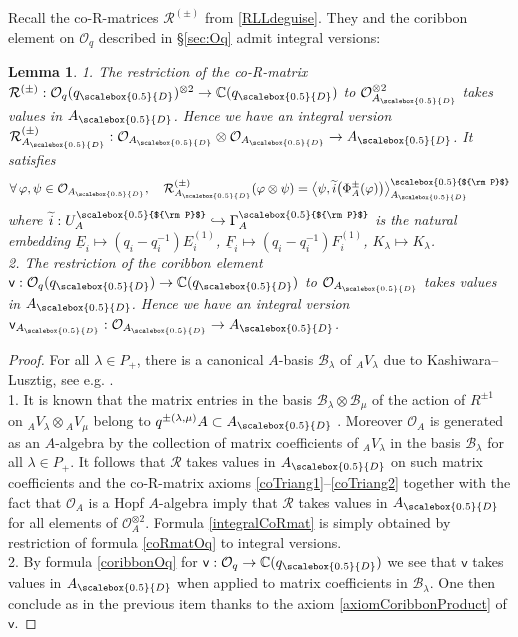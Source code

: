 \documentclass[11pt]{amsart}
\newtheorem{lem}[teo]{Lemma}
\newcommand{\Oo}{\mathcal{O}}
\newcommand{\qD}{q_{\scalebox{0.5}{D}}}
\newcommand{\AD}{A_{\scalebox{0.5}{D}}}
\newcommand{\Pup}{{\scalebox{0.5}{${\rm P}$}}}
\begin{document}
\indent Recall the co-R-matrices $\mathcal{R}^{(\pm)}$ from \eqref{RLLdeguise}. They and the coribbon element on $\mathcal{O}_q$ described in \S\ref{sec:Oq} admit integral versions:
\begin{lem}\label{lemIntegralRandCorib}
1. The restriction of the co-R-matrix $\mathcal{R}^{(\pm)} : \mathcal{O}_q(\qD)^{\otimes 2} \to \mathbb{C}(\qD)$ to $\mathcal{O}_{\AD}^{\otimes 2}$ takes values in $\AD$. Hence we have an integral version $\mathcal{R}_{\AD}^{(\pm)}  : \mathcal{O}_{\AD} \otimes \mathcal{O}_{\AD} \to \AD$. It satisfies
\begin{equation}\label{integralCoRmat}
\forall \, \varphi, \psi \in \Oo_{\AD}, \quad \mathcal{R}_{\AD}^{(\pm)} (\varphi \otimes \psi) = \bigl\langle  \psi, \widetilde{i}\bigl(\Phi^\pm_A(\varphi) \bigr) \bigr\rangle_{\AD}^\Pup
\end{equation}
where $\widetilde{i} :  U_A^\Pup \hookrightarrow \Gamma_A^\Pup$ is the natural embedding $\underline{E}_i \mapsto (q_i-q_i^{-1})E_i^{(1)}$, $\underline{F}_i \mapsto (q_i-q_i^{-1})F_i^{(1)}$, $K_\lambda \mapsto K_\lambda$.
\\2. The restriction of the coribbon element $\mathsf{v} : \mathcal{O}_q(\qD) \to \mathbb{C}(\qD)$ to $\mathcal{O}_{\AD}$ takes values in $\AD$. Hence we have an integral version $\mathsf{v}_{\AD} : \mathcal{O}_{\AD} \to \AD$.
\end{lem}
\begin{proof}
For all $\lambda \in P_+$, there is a canonical $A$-basis $\mathcal{B}_\lambda$ of $_AV_\lambda$ due to Kashiwara--Lusztig, see e.g. \cite[Chap.\,14]{CP}.
\\1. It is known that the matrix entries in the basis $\mathcal{B}_\lambda \otimes \mathcal{B}_\mu$ of the action of $R^{\pm 1}$ on ${}_AV_\lambda \otimes {}_AV_\mu$ belong to $q^{\pm (\lambda,\mu)}A \subset \AD$ \cite[Th.\,32.1.5]{Lusztig}. Moreover $\mathcal{O}_A$ is generated as an $A$-algebra by the collection of matrix coefficients of $_AV_\lambda$ in the basis $\mathcal{B}_\lambda$ for all $\lambda \in P_+$. It follows that $\mathcal{R}$ takes values in $\AD$ on such matrix coefficients and the co-R-matrix axioms \eqref{coTriang1}--\eqref{coTriang2} together with the fact that $\mathcal{O}_A$ is a Hopf $A$-algebra imply that $\mathcal{R}$ takes values in $\AD$ for all elements of $\mathcal{O}_A^{\otimes 2}$. Formula \eqref{integralCoRmat} is simply obtained by restriction of formula \eqref{coRmatOq} to integral versions.
\\2. By formula \eqref{coribbonOq} for $\mathsf{v} : \mathcal{O}_q \to \mathbb{C}(\qD)$ we see that $\mathsf{v}$ takes values in $\AD$ when applied to matrix coefficients in $\mathcal{B}_\lambda$. One then conclude as in the previous item thanks to the axiom \eqref{axiomCoribbonProduct} of $\mathsf{v}$.
\end{proof}
\end{document}
